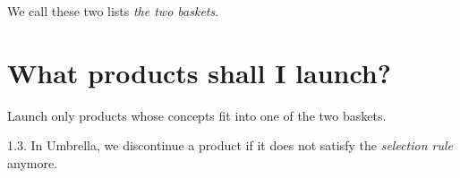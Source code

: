 \documentclass[11pt]{article}
\theoremstyle{remark}
\theoremstyle{definition}
\begin{document}
We call these two lists \textit{the two baskets}.




\section{What products shall I launch?}
















Launch only products whose	concepts fit into one of the two baskets. 




\item[1.3.] In Umbrella, we discontinue a product if it does not satisfy the \textit{selection rule} anymore.
\end{document}
